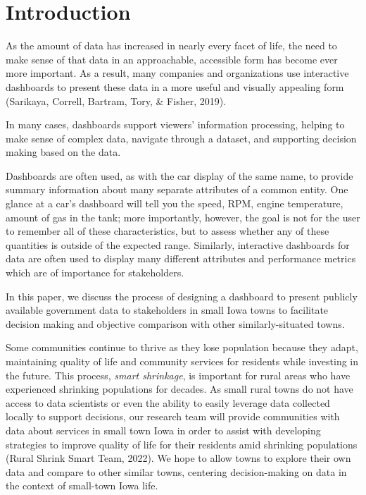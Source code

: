 \documentclass[print]{nuthesis}
\begin{document}
\hypertarget{introduction-1}{%
\section{Introduction}\label{introduction-1}}

As the amount of data has increased in nearly every facet of life, the need to make sense of that data in an approachable, accessible form has become ever more important.
As a result, many companies and organizations use interactive dashboards to present these data in a more useful and visually appealing form (Sarikaya, Correll, Bartram, Tory, \& Fisher, 2019).

In many cases, dashboards support viewers' information processing, helping to make sense of complex data, navigate through a dataset, and supporting decision making based on the data.

Dashboards are often used, as with the car display of the same name, to provide summary information about many separate attributes of a common entity. One glance at a car's dashboard will tell you the speed, RPM, engine temperature, amount of gas in the tank; more importantly, however, the goal is not for the user to remember all of these characteristics, but to assess whether any of these quantities is outside of the expected range.
Similarly, interactive dashboards for data are often used to display many different attributes and performance metrics which are of importance for stakeholders.

In this paper, we discuss the process of designing a dashboard to present publicly available government data to stakeholders in small Iowa towns to facilitate decision making and objective comparison with other similarly-situated towns.

Some communities continue to thrive as they lose population because they adapt, maintaining quality of life and community services for residents while investing in the future. This process, \emph{smart shrinkage}, is important for rural areas who have experienced shrinking populations for decades. As small rural towns do not have access to data scientists or even the ability to easily leverage data collected locally to support decisions, our research team will provide communities with data about services in small town Iowa in order to assist with developing strategies to improve quality of life for their residents amid shrinking populations (Rural Shrink Smart Team, 2022). We hope to allow towns to explore their own data and compare to other similar towns, centering decision-making on data in the context of small-town Iowa life.
\end{document}
